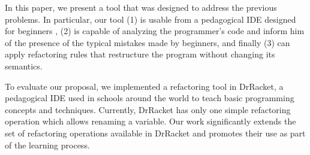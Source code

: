 In this paper, we present a tool that was designed to address the
previous problems.  In particular, our tool (1) is usable from a
pedagogical IDE designed for beginners
\cite{pears2007survey,kolling2003bluej}, (2) is capable of analyzing
the programmer's code and inform him of the presence of the typical
mistakes made by beginners, and finally (3) can apply refactoring
rules that restructure the program without changing its semantics.

To evaluate our proposal, we implemented a refactoring tool in
DrRacket, a pedagogical IDE \cite{drscheme,drscheme_pegadogy} used in
schools around the world to teach basic programming concepts and
techniques.  Currently, DrRacket has only one simple refactoring
operation which allows renaming a variable.  Our work significantly
extends the set of refactoring operations available in DrRacket and
promotes their use as part of the learning process.
